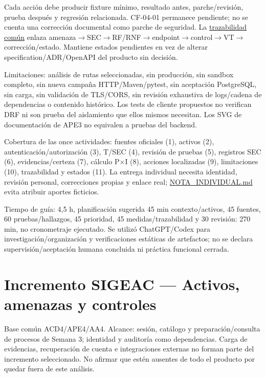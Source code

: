 \documentclass[12pt,a4paper]{report}
\begin{document}
Cada acción debe producir fixture mínimo, resultado antes,
parche/revisión, prueba después y regresión relacionada. CF-04-01
permanece pendiente; no se cuenta una corrección documental como parche
de seguridad. La
\href{../soporte-semanas-4-5/HALLAZGOS_Y_TRAZABILIDAD.md}{trazabilidad
común} enlaza amenaza\ensuremath{\rightarrow}SEC\ensuremath{\rightarrow}RF/RNF\ensuremath{\rightarrow}endpoint\ensuremath{\rightarrow}control\ensuremath{\rightarrow}VT\ensuremath{\rightarrow}corrección/estado.
Mantiene estados pendientes en vez de alterar specification/ADR/OpenAPI
del producto sin decisión.

Limitaciones: análisis de rutas seleccionadas, sin producción, sin
sandbox completo, sin nueva campaña HTTP/Maven/pytest, sin aceptación
PostgreSQL, sin carga, sin validación de TLS/CORS, sin revisión
exhaustiva de logs/cadena de dependencias o contenido histórico. Los
tests de cliente propuestos no verifican DRF ni son prueba del
aislamiento que ellos mismos necesitan. Los SVG de documentación de APE3
no equivalen a pruebas del backend.

Cobertura de las once actividades: fuentes oficiales (1), activos (2),
autenticación/autorización (3), T/SEC (4), revisión de pruebas (5),
registros SEC (6), evidencias/certeza (7), cálculo P\ensuremath{\times}I (8), acciones
localizadas (9), limitaciones (10), trazabilidad y estados (11). La
entrega individual necesita identidad, revisión personal, correcciones
propias y enlace real; \url{NOTA_INDIVIDUAL.md} evita atribuir aportes
ficticios.

Tiempo de guía: 4,5 h, planificación sugerida 45 min contexto/activos,
45 fuentes, 60 pruebas/hallazgos, 45 prioridad, 45 medidas/trazabilidad
y 30 revisión: 270 min, no cronometraje ejecutado. Se utilizó
ChatGPT/Codex para investigación/organización y verificaciones estáticas
de artefactos; no se declara supervisión/aceptación humana concluida ni
práctica funcional cerrada.

\chapter{Incremento SIGEAC --- Activos, amenazas y
controles}\label{AA4-semana-4-anexo0-incremento-sigeac--activos-amenazas-y-controles}

Base común ACD4/APE4/AA4. Alcance: sesión, catálogo y
preparación/consulta de procesos de Semana 3; identidad y auditoría como
dependencias. Carga de evidencias, recuperación de cuenta e
integraciones externas no forman parte del incremento seleccionado. No
afirmar que estén ausentes de todo el producto por quedar fuera de este
análisis.
\end{document}

